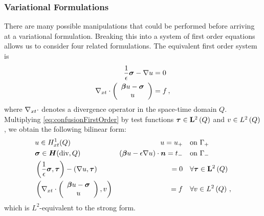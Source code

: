 \documentclass{article}
\begin{document}
\subsubsection{Variational Formulations}
There are many possible manipulations that could be performed before arriving at a variational formulation. 
Breaking this into a system of first order equations allows us to consider four related formulations.
The equivalent first order system is
\begin{equation}
\label{eq:confusionFirstOrder}
\begin{aligned}
\frac{1}{\epsilon}\boldsymbol\sigma-\nabla u&=0\\
\nabla_{xt}\cdot\left( \begin{array}{c} \boldsymbol\beta u-\boldsymbol\sigma\\ u\\ \end{array} \right)&=f\,,
\end{aligned}
\end{equation}
where $\nabla_{xt}\cdot$ denotes a divergence operator in the space-time domain $Q$.
Multiplying \eqref{eq:confusionFirstOrder} by test functions $\boldsymbol\tau\in\mathbf{L}^2\left( Q \right)$ and $v\in L^2\left( Q \right)$, we obtain the following bilinear form:
\begin{equation}
\label{eq:confusionStrongBF}
	\begin{aligned}
		&u\in H^1_{xt}(Q) &u=u_+\quad &\text{on }\Gamma_+\\
		&\boldsymbol\sigma\in \mbox{\boldmath $H$}(\text{div},Q)&(\boldsymbol\beta u-\epsilon\nabla u)\cdot\boldsymbol n=t_-\quad &\text{on }\Gamma_-\\
		&\left( \frac{1}{\epsilon}\boldsymbol\sigma,\boldsymbol\tau \right)-\left( \nabla u,\boldsymbol\tau \right)&=0\quad&\forall\boldsymbol\tau\in\mathbf{L}^2\left( Q \right)\\
		&\left( \nabla_{xt}\cdot\left( \begin{array}{c} \boldsymbol\beta u-\boldsymbol\sigma\\ u\\ \end{array} \right),v \right)&=f\quad&\forall v\in L^2\left( Q \right)\,,
	\end{aligned}
\end{equation}
which is $L^2$-equivalent to the strong form.
\end{document}
